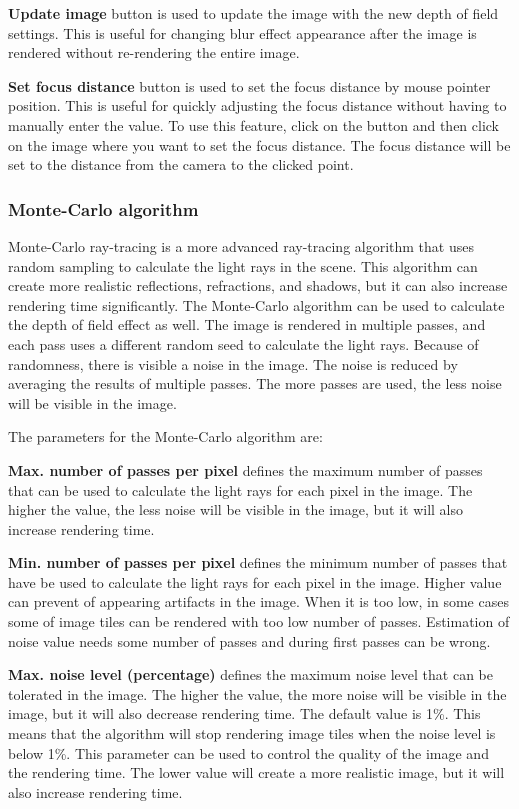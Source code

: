 \textbf{Update image} button is used to update the image with the new depth of field settings. This is useful for changing blur effect appearance after the image is rendered without re-rendering the entire image. 

\textbf{Set focus distance} button is used to set the focus distance by mouse pointer position. This is useful for quickly adjusting the focus distance without having to manually enter the value. To use this feature, click on the button and then click on the image where you want to set the focus distance. The focus distance will be set to the distance from the camera to the clicked point.

\subsubsection{Monte-Carlo algorithm}\label{effects-ray-tracing-monte-carlo}
Monte-Carlo ray-tracing is a more advanced ray-tracing algorithm that uses random sampling to calculate the light rays in the scene. This algorithm can create more realistic reflections, refractions, and shadows, but it can also increase rendering time significantly. The Monte-Carlo algorithm can be used to calculate the depth of field effect as well. The image is rendered in multiple passes, and each pass uses a different random seed to calculate the light rays. Because of randomness, there is visible a noise in the image. The noise is reduced by averaging the results of multiple passes. The more passes are used, the less noise will be visible in the image. 

The parameters for the Monte-Carlo algorithm are:

\textbf{Max. number of passes per pixel} defines the maximum number of passes that can be used to calculate the light rays for each pixel in the image. The higher the value, the less noise will be visible in the image, but it will also increase rendering time.

\textbf{Min. number of passes per pixel} defines the minimum number of passes that have be used to calculate the light rays for each pixel in the image. Higher value can prevent of appearing artifacts in the image. When it is too low, in some cases some of image tiles can be rendered with too low number of passes. Estimation of noise value needs some number of passes and during first passes can be wrong.

\textbf{Max. noise level (percentage)} defines the maximum noise level that can be tolerated in the image. The higher the value, the more noise will be visible in the image, but it will also decrease rendering time. The default value is 1\%. This means that the algorithm will stop rendering image tiles when the noise level is below 1\%. This parameter can be used to control the quality of the image and the rendering time. The lower value will create a more realistic image, but it will also increase rendering time.

